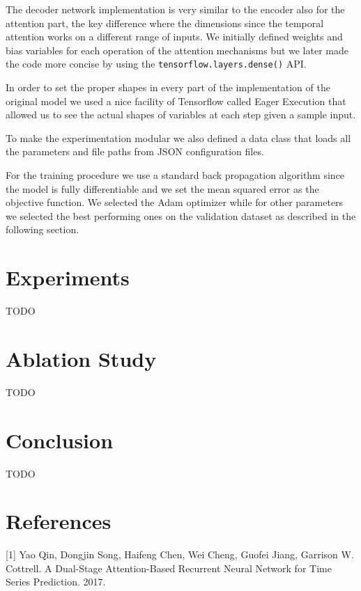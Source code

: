 \documentclass{article}
\begin{document}
The decoder network implementation is very similar to the encoder also for the attention part, the key difference where 
the dimensions since the temporal attention works on a different range of inputs. We initially defined weights and bias 
variables for each operation of the attention mechanisms but we later made the code more concise by using the 
\texttt{tensorflow.layers.dense()} API.

In order to set the proper shapes in every part of the implementation of the original model we used a nice facility of 
Tensorflow called Eager Execution that allowed us to see the actual shapes of variables at each step given a sample 
input.

To make the experimentation modular we also defined a data class that loads all the parameters and file paths from 
JSON configuration files.

For the training procedure we use a standard back propagation algorithm since the model is fully differentiable and we 
set the mean squared error as the objective function. We selected the Adam optimizer while for other parameters we 
selected the best performing ones on the validation dataset as described in the following section.

\section{Experiments}

TODO

\section{Ablation Study}

TODO

\section{Conclusion}

TODO

\section*{References}

\small

[1] Yao Qin, Dongjin Song, Haifeng Chen, Wei Cheng, Guofei Jiang, Garrison W. Cottrell. A Dual-Stage Attention-Based Recurrent Neural Network for Time Series Prediction. 2017.
\end{document}
